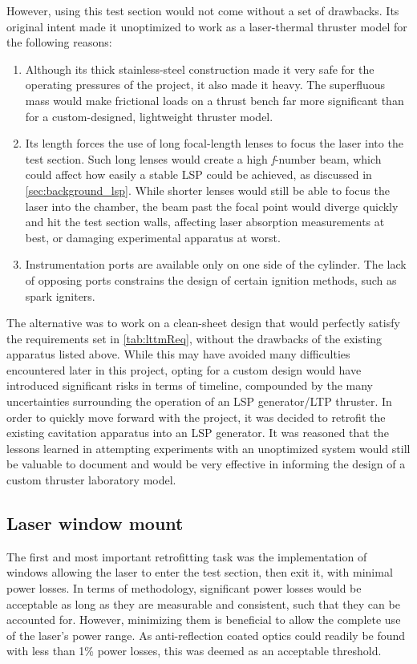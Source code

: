             However, using this test section would not come without a set of drawbacks. Its original intent made it unoptimized to work as a laser-thermal thruster model for the following reasons:
            \begin{enumerate}
                \item Although its thick stainless-steel construction made it very safe for the operating pressures of the project, it also made it heavy. The superfluous mass would make frictional loads on a thrust bench far more significant than for a custom-designed, lightweight thruster model.
                \item Its length forces the use of long focal-length lenses to focus the laser into the test section. Such long lenses would create a high {\itshape f}-number beam, which could affect how easily a stable LSP could be achieved, as discussed in \autoref{sec:background_lsp}. While shorter lenses would still be able to focus the laser into the chamber, the beam past the focal point would diverge quickly and hit the test section walls, affecting laser absorption measurements at best, or damaging experimental apparatus at worst.
                \item Instrumentation ports are available only on one side of the cylinder. The lack of opposing ports constrains the design of certain ignition methods, such as spark igniters.
            \end{enumerate}

            The alternative was to work on a clean-sheet design that would perfectly satisfy the requirements set in \autoref{tab:lttmReq}, without the drawbacks of the existing apparatus listed above. While this may have avoided many difficulties encountered later in this project, opting for a custom design would have introduced significant risks in terms of timeline, compounded by the many uncertainties surrounding the operation of an LSP generator/LTP thruster. In order to quickly move forward with the project, it was decided to retrofit the existing cavitation apparatus into an LSP generator. It was reasoned that the lessons learned in attempting experiments with an unoptimized system would still be valuable to document and would be very effective in informing the design of a custom thruster laboratory model.

        \subsection{Laser window mount} \label{sec:design_lwm}
            The first and most important retrofitting task was the implementation of windows allowing the laser to enter the test section, then exit it, with minimal power losses. In terms of methodology, significant power losses would be acceptable as long as they are measurable and consistent, such that they can be accounted for. However, minimizing them is beneficial to allow the complete use of the laser's power range. As anti-reflection coated optics could readily be found with less than 1\% power losses, this was deemed as an acceptable threshold.

